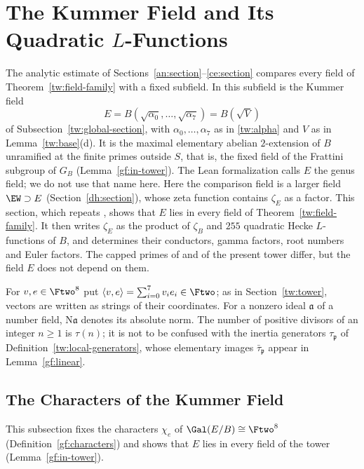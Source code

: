 \section{\texorpdfstring{The Kummer Field and Its Quadratic $L$-Functions}{The Kummer Field and Its Quadratic L-Functions}}\label{gf:section}

The analytic estimate of Sections~\ref{an:section}--\ref{ce:section}
compares every field of Theorem~\ref{tw:field-family} with a fixed subfield.
In \cite{Naslund04273} this subfield is the Kummer field
\[
 E=B(\sqrt{\alpha_0},\ldots,\sqrt{\alpha_7})=B(\sqrt V)
\]
of Subsection~\ref{tw:global-section}, with $\alpha_0,\ldots,\alpha_7$ as in
\eqref{tw:alpha} and $V$ as in Lemma~\ref{tw:base}(d). It is the maximal
elementary abelian $2$-extension of $B$ unramified at the finite primes
outside $S$, that is, the fixed field of the Frattini subgroup of $G_B$
(Lemma~\ref{gf:in-tower}). The Lean formalization calls $E$ the genus field;
we do not use that name here. Here the comparison field is a larger field
$\EW\supset E$ (Section~\ref{dh:section}), whose zeta function contains
$\zeta_E$ as a factor. This section, which repeats
\cite[Section~3]{Naslund04273}, shows that $E$ lies in every field of
Theorem~\ref{tw:field-family}. It then writes $\zeta_E$ as the product of
$\zeta_B$ and $255$ quadratic Hecke $L$-functions of $B$, and determines
their conductors, gamma factors, root numbers and Euler factors. The capped
primes of \cite{Naslund04273} and of the present tower differ, but the field
$E$ does not depend on them.

For $v,e\in\Ftwo^8$ put $\langle v,e\rangle=\sum_{i=0}^7v_ie_i\in\Ftwo$; as
in Section~\ref{tw:tower}, vectors are written as strings of their
coordinates. For a nonzero ideal $\mathfrak a$ of a number field,
$\mathrm N\mathfrak a$ denotes its absolute norm. The number of positive
divisors of an integer $n\ge1$ is $\tau(n)$; it is not to be confused with
the inertia generators $\tau_{\mathfrak p}$ of
Definition~\ref{tw:local-generators}, whose elementary images
$\bar\tau_{\mathfrak p}$ appear in Lemma~\ref{gf:linear}.

\subsection{The Characters of the Kummer Field}\label{gf:characters-section}
This subsection fixes the characters $\chi_e$ of $\Gal(E/B)\cong\Ftwo^8$
(Definition~\ref{gf:characters}) and shows that $E$ lies in every field of
the tower (Lemma~\ref{gf:in-tower}).

